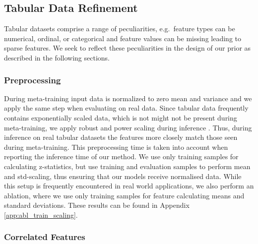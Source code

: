 \documentclass{article}
\begin{document}
\subsection{Tabular Data Refinement}
\label{sec:tabular data refinement}

Tabular datasets comprise a range of peculiarities, e.g.\ feature types can be numerical, ordinal, or
categorical and feature values can be missing leading to sparse features. We seek to reflect these peculiarities in the design of our prior as described in the following sections. 

\subsubsection{Preprocessing} \label{app:preprocessing} During meta-training input data is normalized to zero mean and variance and we apply the same step when evaluating on real data. Since tabular data frequently contains exponentially scaled data, which is not might not be present during meta-training, we apply robust and power scaling during inference \citep{yeo2000new}. Thus, during inference on real tabular datasets the features more closely match those seen during meta-training. This preprocessing time is taken into account when reporting the inference time of our method.
We use only training samples for calculating z-statistics, but use training and evaluation samples to perform mean and std-scaling, thus ensuring that our models receive normalised data. While this setup is frequently encountered in real world applications, we also perform an ablation, where we use only training samples for feature calculating means and standard deviations. These results can be found in Appendix \ref{app:abl_train_scaling}.

\subsubsection{Correlated Features}
\end{document}
